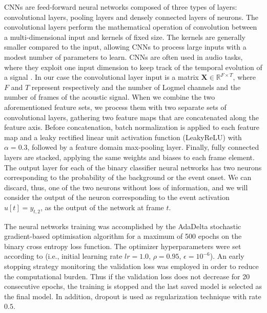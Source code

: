 CNNs are feed-forward neural networks \cite{Yann-cnn-1998} composed of three types of layers: convolutional layers, pooling layers and densely connected layers of neurons. The convolutional layers perform the mathematical operation of convolution between a multi-dimensional input and  kernels of fixed size. The kernels are generally smaller compared to the input, allowing CNNs to process large inputs with a modest number of parameters to learn. CNNs are often used in audio tasks, where they exploit one input dimension to keep track of the temporal evolution of a signal \cite{thomas2014analyzing}.
In our case the convolutional layer input is a matrix $\mathbf{X} \in \mathbb{R}^{F \times T}$, where $F$ and $T$ represent respectively and the number of Logmel channels and the number of frames of the acoustic signal.
When we combine the two aforementioned feature sets, we process them with two separate sets of convolutional layers, gathering two feature maps that are concatenated along the feature axis. Before concatenation, batch normalization \cite{ioffe2015batch} is applied to each feature map and a leaky rectified linear unit activation function (LeakyReLU) with $\alpha=0.3$, followed by a feature domain max-pooling layer.
Finally, fully connected layers are stacked, applying the same weights and biases to each frame element. The output layer for each of the binary classifier neural networks has two neurons corresponding to the probability of the background or the event onset. We can discard, thus, one of the two neurons without loss of information, and we will consider the output of the neuron corresponding to the event activation $u[t] = y_{t,2}$, as the output of the network at frame $t$.

The neural networks training was accomplished by the AdaDelta stochastic gradient-based optimisation algorithm \cite{zeiler2012adadelta} for a maximum of 500 epochs on the binary cross entropy loss function. The optimizer hyperparameters were set according to \cite{zeiler2012adadelta} (i.e., initial learning rate $lr=1.0$, $\rho=0.95$, $\epsilon=10^{-6}$). An early stopping strategy monitoring the validation loss was employed in order to reduce the computational burden. Thus if the validation loss does not decrease for 20 consecutive epochs, the training is stopped and the last saved model is selected as the final model. In addition, dropout is used as regularization technique \cite{srivastava2014dropout} with rate $0.5$. 

